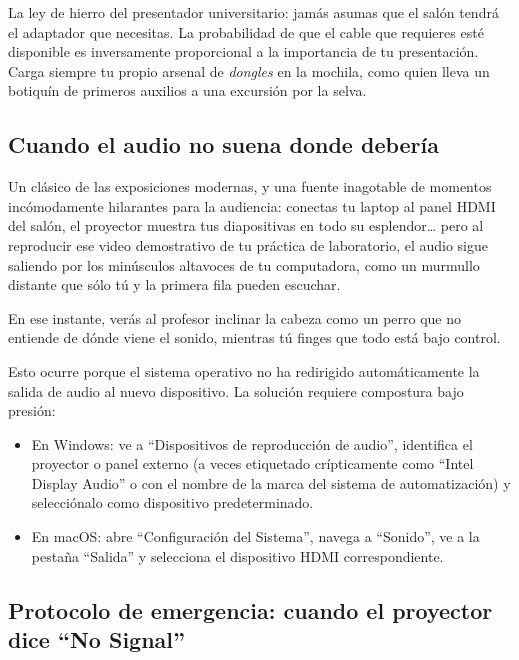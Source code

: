 \begin{remember}
	\label{rem:dongle}
	La ley de hierro del presentador universitario: jamás asumas que el salón tendrá el adaptador que necesitas.
	La probabilidad de que el cable que requieres esté disponible es inversamente proporcional a la importancia de tu presentación.
	Carga siempre tu propio arsenal de \emph{dongles} en la mochila, como quien lleva un botiquín de primeros auxilios a una excursión por la selva.
\end{remember}

\subsection*{Cuando el audio no suena donde debería}

Un clásico de las exposiciones modernas, y una fuente inagotable de momentos incómodamente hilarantes para la audiencia: conectas tu laptop al panel HDMI del salón, el proyector muestra tus diapositivas en todo su esplendor\ldots{} pero al reproducir ese video demostrativo de tu práctica de laboratorio, el audio sigue saliendo por los minúsculos altavoces de tu computadora, como un murmullo distante que sólo tú y la primera fila pueden escuchar.

En ese instante, verás al profesor inclinar la cabeza como un perro que no entiende de dónde viene el sonido, mientras tú finges que todo está bajo control.

Esto ocurre porque el sistema operativo no ha redirigido automáticamente la salida de audio al nuevo dispositivo.
La solución requiere compostura bajo presión:

\begin{itemize}
	\item En Windows: ve a “Dispositivos de reproducción de audio”, identifica el proyector o panel externo (a veces etiquetado crípticamente como “Intel Display Audio” o con el nombre de la marca del sistema de automatización) y selecciónalo como dispositivo predeterminado.
	\item En macOS: abre “Configuración del Sistema”, navega a “Sonido”, ve a la pestaña “Salida” y selecciona el dispositivo HDMI correspondiente.
\end{itemize}

\subsection*{Protocolo de emergencia: cuando el proyector dice “No Signal”}

